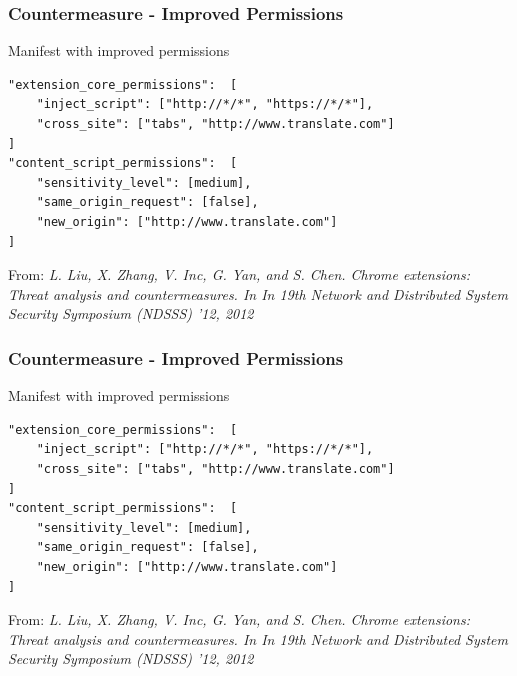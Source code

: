 \documentclass[accentcolor=tud9c,colorbacktitle,xcolor=dvipsnames]{tudbeamer}
\newcommand{\highlight}[4]{%
	\ifnum\value{lstnumber}=#1\color{orange!30}\fi%
	\ifnum\value{lstnumber}=#2\color{orange!30}\fi%
	\ifnum\value{lstnumber}=#3\color{orange!30}\fi%
	\ifnum\value{lstnumber}=#4\color{orange!30}\fi%
}
\begin{document}
\begin{frame}[fragile]
    \frametitle{Countermeasure - Improved Permissions}
    \begin{block}{Manifest with improved permissions}
        \begin{lstlisting}[linebackgroundcolor={\highlight{2}{3}{7}{0}}]
"extension_core_permissions":  [
    "inject_script": ["http://*/*", "https://*/*"],
    "cross_site": ["tabs", "http://www.translate.com"]
]
"content_script_permissions":  [
    "sensitivity_level": [medium],
    "same_origin_request": [false],
    "new_origin": ["http://www.translate.com"]
]
\end{lstlisting} 
    \end{block} 
    \begin{footnotesize}
        From: \textit{L. Liu, X. Zhang, V. Inc, G. Yan, and S. Chen. Chrome extensions: Threat analysis and countermeasures. In In 19th Network and Distributed System Security Symposium (NDSSS) ’12, 2012}
    \end{footnotesize}  
\end{frame}

\begin{frame}[fragile]
    \frametitle{Countermeasure - Improved Permissions}
    \begin{block}{Manifest with improved permissions}
        \begin{lstlisting}[linebackgroundcolor={\highlight{0}{8}{0}{0}}]
"extension_core_permissions":  [
    "inject_script": ["http://*/*", "https://*/*"],
    "cross_site": ["tabs", "http://www.translate.com"]
]
"content_script_permissions":  [
    "sensitivity_level": [medium],
    "same_origin_request": [false],
    "new_origin": ["http://www.translate.com"]
]
\end{lstlisting} 
    \end{block} 
    \begin{footnotesize}
        From: \textit{L. Liu, X. Zhang, V. Inc, G. Yan, and S. Chen. Chrome extensions: Threat analysis and countermeasures. In In 19th Network and Distributed System Security Symposium (NDSSS) ’12, 2012}
    \end{footnotesize}  
\end{frame}
\end{document}

